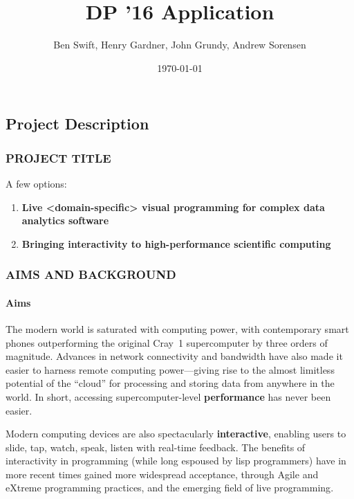 \documentclass[a4paper]{scrartcl}
\author{Ben Swift, Henry Gardner, John Grundy, Andrew Sorensen}
\date{\today}
\title{DP '16 Application}
\begin{document}
\renewcommand{\thesection}{\Alph{section}}

\setcounter{section}{3} %
\subsection{Project Description}
\label{sec:project-description}

\subsubsection*{PROJECT TITLE}

A few options:

\begin{enumerate}
\item \textbf{Live <domain-specific> visual programming for complex
    data analytics software}
\item \textbf{Bringing interactivity to high-performance scientific
    computing}
\end{enumerate}

\subsubsection*{AIMS AND BACKGROUND}

\paragraph{Aims}

The modern world is saturated with computing power, with contemporary
smart phones outperforming the original Cray~1 supercomputer by three
orders of magnitude. Advances in network connectivity and bandwidth
have also made it easier to harness remote computing power---giving
rise to the almost limitless potential of the ``cloud'' for processing
and storing data from anywhere in the world. In short, accessing
supercomputer-level \textbf{performance} has never been easier.

Modern computing devices are also spectacularly \textbf{interactive},
enabling users to slide, tap, watch, speak, listen with real-time
feedback. The benefits of interactivity in programming (while long
espoused by lisp programmers) have in more recent times gained more
widespread acceptance, through Agile\parencite{Fowler2001} and
eXtreme\parencite{Beck1999} programming practices, and the emerging
field of live programming\parencite{Swift2013b}.
\end{document}
